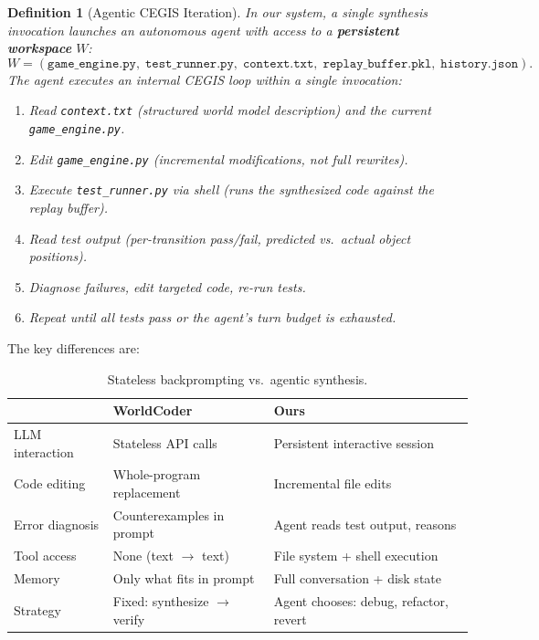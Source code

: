 \documentclass{article}
\newtheorem{definition}{Definition}
\begin{document}
\begin{definition}[Agentic CEGIS Iteration]
\label{def:agentic_cegis}
In our system, a single synthesis invocation launches an autonomous agent
with access to a \textbf{persistent workspace} $W$:
\begin{equation}
    W = (\texttt{game\_engine.py}, \; \texttt{test\_runner.py}, \;
         \texttt{context.txt}, \; \texttt{replay\_buffer.pkl}, \;
         \texttt{history.json}).
\end{equation}
The agent executes an \emph{internal} CEGIS loop within a single invocation:
\begin{enumerate}[nosep]
    \item Read \texttt{context.txt} (structured world model description) and
          the current \texttt{game\_engine.py}.
    \item Edit \texttt{game\_engine.py} (incremental modifications, not full
          rewrites).
    \item Execute \texttt{test\_runner.py} via shell (runs the synthesized code
          against the replay buffer).
    \item Read test output (per-transition pass/fail, predicted vs.\ actual
          object positions).
    \item Diagnose failures, edit targeted code, re-run tests.
    \item Repeat until all tests pass or the agent's turn budget is exhausted.
\end{enumerate}
\end{definition}

The key differences are:

\begin{table}[h]
\centering
\caption{Stateless backprompting vs.\ agentic synthesis.}
\label{tab:agentic}
\begin{tabular}{@{}lll@{}}
\toprule
& \textbf{WorldCoder} & \textbf{Ours} \\
\midrule
LLM interaction & Stateless API calls & Persistent interactive session \\
Code editing & Whole-program replacement & Incremental file edits \\
Error diagnosis & Counterexamples in prompt & Agent reads test output, reasons \\
Tool access & None (text $\to$ text) & File system + shell execution \\
Memory & Only what fits in prompt & Full conversation + disk state \\
Strategy & Fixed: synthesize $\to$ verify & Agent chooses: debug, refactor, revert \\
\bottomrule
\end{tabular}
\end{table}
\end{document}
